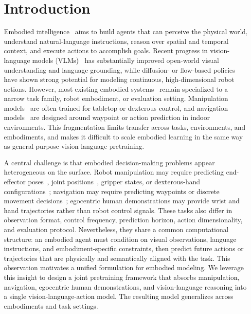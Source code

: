 \documentclass{llmxive}
\begin{document}
\section{Introduction}

Embodied intelligence~\citep{zitkovich2023rt,o2024open} aims to build agents that can perceive the physical world, understand natural-language instructions, reason over spatial and temporal context, and execute actions to accomplish goals. Recent progress in vision-language models (VLMs)~\citep{Qwen2-VL,qwen2.5vl,team2025gemini,bai2025qwen3,qwen35blog} has substantially improved open-world visual understanding and language grounding, while diffusion- or flow-based policies~\citep{black2024pi0,black2025pi05,intelligence2026pi} have shown strong potential for modeling continuous, high-dimensional robot actions. However, most existing embodied systems~\citep{nvidia2025gr00t,luo2025beingh0,yang2026abotm0} remain specialized to a narrow task family, robot embodiment, or evaluation setting. Manipulation models~\citep{intelligence2026pi} are often trained for tabletop or dexterous control, and navigation models~\citep{zhang2024navid,zhang2024uni,cheng2024navila} are designed around waypoint or action prediction in indoor environments. This fragmentation limits transfer across tasks, environments, and embodiments, and makes it difficult to scale embodied learning in the same way as general-purpose vision-language pretraining.

A central challenge is that embodied decision-making problems appear heterogeneous on the surface. Robot manipulation may require predicting end-effector poses~\citep{black2024pi0,zheng2025x,zhang2026vlm4vla}, joint positions~\citep{fu2024mobile,nvidia2025gr00t}, gripper states, or dexterous-hand configurations~\citep{luo2025beingh0}; navigation may require predicting waypoints or discrete movement decisions~\citep{navfom,wang2025trackvla,wei2025streamvln}; egocentric human demonstrations may provide wrist and hand trajectories rather than robot control signals. These tasks also differ in observation format, control frequency, prediction horizon, action dimensionality, and evaluation protocol. Nevertheless, they share a common computational structure: an embodied agent must condition on visual observations, language instructions, and embodiment-specific constraints, then predict future actions or trajectories that are physically and semantically aligned with the task. This observation motivates a unified formulation for embodied modeling.
%
We leverage this insight to design a joint pretraining framework that absorbs manipulation, navigation, egocentric human demonstrations, and vision-language reasoning into a single vision-language-action model. The resulting model generalizes across embodiments and task settings.
\end{document}
